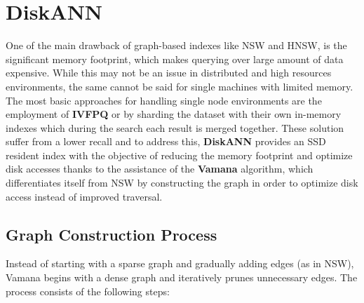  
\section{DiskANN}
One of the main drawback of graph-based indexes like NSW and HNSW, is the significant memory footprint, which makes querying over large amount of data expensive. While this may not be an issue in distributed and high resources environments, the same cannot be said for single machines with limited memory. The most basic approaches for handling single node environments are the employment of \textbf{IVFPQ} or by sharding the dataset with their own in-memory indexes which during the search each result is merged together. These solution suffer from a lower recall and to address this, \textbf{DiskANN} provides an SSD resident index with the objective of reducing the memory footprint and optimize disk accesses thanks to the assistance of the \textbf{Vamana} algorithm, which differentiates itself from NSW by constructing the graph in order to optimize disk access instead of improved traversal.

\subsection{Graph Construction Process}
Instead of starting with a sparse graph and gradually adding edges (as in NSW), Vamana begins with a dense graph and iteratively prunes unnecessary edges. The process consists of the following steps:

